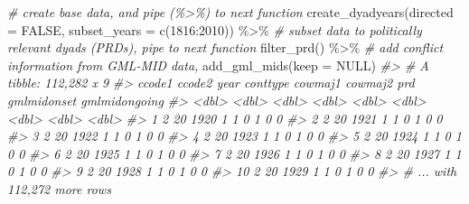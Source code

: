 \documentclass[
  11pt,
]{article}
\newenvironment{Shaded}{\begin{snugshade}}{\end{snugshade}}
\newcommand{\AttributeTok}[1]{\textcolor[rgb]{0.77,0.63,0.00}{#1}}
\newcommand{\CommentTok}[1]{\textcolor[rgb]{0.56,0.35,0.01}{\textit{#1}}}
\newcommand{\ConstantTok}[1]{\textcolor[rgb]{0.00,0.00,0.00}{#1}}
\newcommand{\DecValTok}[1]{\textcolor[rgb]{0.00,0.00,0.81}{#1}}
\newcommand{\FunctionTok}[1]{\textcolor[rgb]{0.00,0.00,0.00}{#1}}
\newcommand{\NormalTok}[1]{#1}
\newcommand{\SpecialCharTok}[1]{\textcolor[rgb]{0.00,0.00,0.00}{#1}}
\begin{document}
\begin{Shaded}
\begin{Highlighting}[]
\CommentTok{\# create base data, and pipe (\%\textgreater{}\%) to next function}
\FunctionTok{create\_dyadyears}\NormalTok{(}\AttributeTok{directed =} \ConstantTok{FALSE}\NormalTok{, }\AttributeTok{subset\_years =} \FunctionTok{c}\NormalTok{(}\DecValTok{1816}\SpecialCharTok{:}\DecValTok{2010}\NormalTok{)) }\SpecialCharTok{\%\textgreater{}\%}
  \CommentTok{\# subset data to politically relevant dyads (PRDs), pipe to next function}
  \FunctionTok{filter\_prd}\NormalTok{() }\SpecialCharTok{\%\textgreater{}\%}
  \CommentTok{\# add conflict information from GML{-}MID data,}
  \FunctionTok{add\_gml\_mids}\NormalTok{(}\AttributeTok{keep =} \ConstantTok{NULL}\NormalTok{) }
\CommentTok{\#\textgreater{} \# A tibble: 112,282 x 9}
\CommentTok{\#\textgreater{}    ccode1 ccode2  year conttype cowmaj1 cowmaj2   prd gmlmidonset gmlmidongoing}
\CommentTok{\#\textgreater{}     \textless{}dbl\textgreater{}  \textless{}dbl\textgreater{} \textless{}dbl\textgreater{}    \textless{}dbl\textgreater{}   \textless{}dbl\textgreater{}   \textless{}dbl\textgreater{} \textless{}dbl\textgreater{}       \textless{}dbl\textgreater{}         \textless{}dbl\textgreater{}}
\CommentTok{\#\textgreater{}  1      2     20  1920        1       1       0     1           0             0}
\CommentTok{\#\textgreater{}  2      2     20  1921        1       1       0     1           0             0}
\CommentTok{\#\textgreater{}  3      2     20  1922        1       1       0     1           0             0}
\CommentTok{\#\textgreater{}  4      2     20  1923        1       1       0     1           0             0}
\CommentTok{\#\textgreater{}  5      2     20  1924        1       1       0     1           0             0}
\CommentTok{\#\textgreater{}  6      2     20  1925        1       1       0     1           0             0}
\CommentTok{\#\textgreater{}  7      2     20  1926        1       1       0     1           0             0}
\CommentTok{\#\textgreater{}  8      2     20  1927        1       1       0     1           0             0}
\CommentTok{\#\textgreater{}  9      2     20  1928        1       1       0     1           0             0}
\CommentTok{\#\textgreater{} 10      2     20  1929        1       1       0     1           0             0}
\CommentTok{\#\textgreater{} \# ... with 112,272 more rows}
\end{Highlighting}
\end{Shaded}
\end{document}
